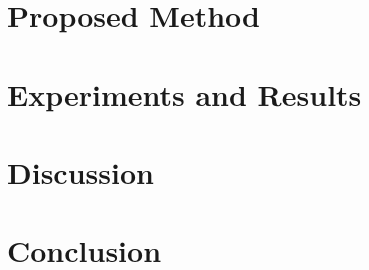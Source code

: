\documentclass[conference]{IEEEtran} %
\begin{document}
	\section{Proposed Method}
	
	\section{Experiments and Results}
	
	\section{Discussion}
	
	\section{Conclusion}
	
	
	
\end{document}
